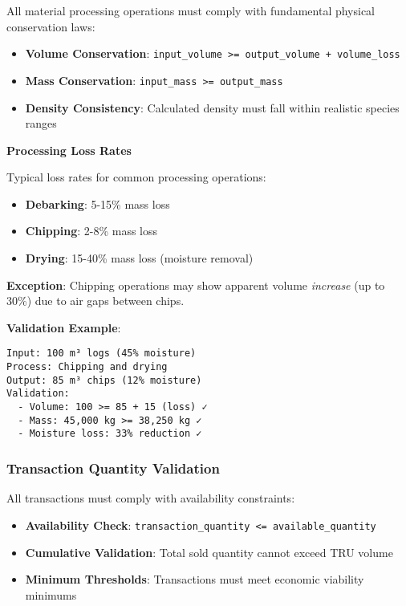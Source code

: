 All material processing operations must comply with fundamental physical conservation laws:

\begin{itemize}
    \item \textbf{Volume Conservation}: \texttt{input\_volume >= output\_volume + volume\_loss}
    \item \textbf{Mass Conservation}: \texttt{input\_mass >= output\_mass}
    \item \textbf{Density Consistency}: Calculated density must fall within realistic species ranges
\end{itemize}

\textbf{Processing Loss Rates}

Typical loss rates for common processing operations:
\begin{itemize}
    \item \textbf{Debarking}: 5-15\% mass loss
    \item \textbf{Chipping}: 2-8\% mass loss
    \item \textbf{Drying}: 15-40\% mass loss (moisture removal)
\end{itemize}

\textbf{Exception}: Chipping operations may show apparent volume \emph{increase} (up to 30\%) due to air gaps between chips.

\textbf{Validation Example}:
\begin{verbatim}
Input: 100 m³ logs (45% moisture)
Process: Chipping and drying
Output: 85 m³ chips (12% moisture)
Validation: 
  - Volume: 100 >= 85 + 15 (loss) ✓
  - Mass: 45,000 kg >= 38,250 kg ✓
  - Moisture loss: 33% reduction ✓
\end{verbatim}

\subsubsection{Transaction Quantity Validation}

All transactions must comply with availability constraints:

\begin{itemize}
    \item \textbf{Availability Check}: \texttt{transaction\_quantity <= available\_quantity}
    \item \textbf{Cumulative Validation}: Total sold quantity cannot exceed TRU volume
    \item \textbf{Minimum Thresholds}: Transactions must meet economic viability minimums
\end{itemize}

